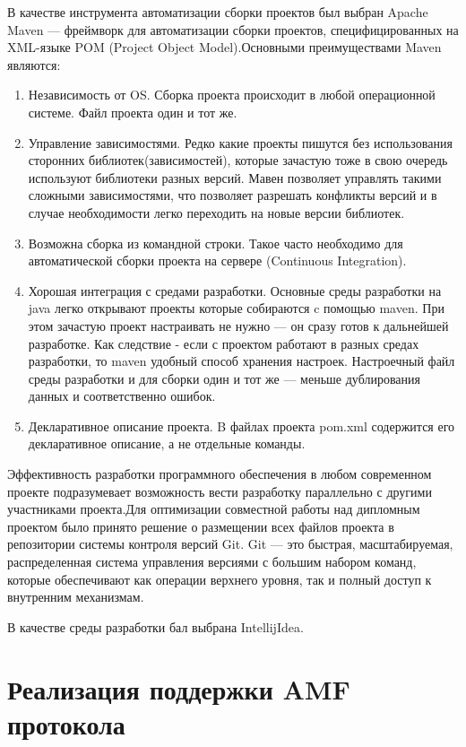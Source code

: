 В качестве инструмента автоматизации сборки проектов был выбран Apache Maven --- фреймворк для автоматизации сборки
проектов, специфицированных на XML-языке POM (Project Object Model).Основными преимуществами Maven являются:

\begin{enumerate}
\item Независимость от OS. Сборка проекта происходит в любой операционной системе. Файл проекта один и тот же.
\item Управление зависимостями. Редко какие проекты пишутся без использования сторонних библиотек(зависимостей), которые
 зачастую тоже в свою очередь используют библиотеки разных версий. Мавен позволяет управлять такими сложными
 зависимостями, что позволяет разрешать конфликты версий и в случае необходимости легко переходить на новые версии
 библиотек.
\item Возможна сборка из командной строки. Такое часто необходимо для автоматической сборки проекта на сервере
(Continuous Integration).
\item Хорошая интеграция с средами разработки. Основные среды разработки на java легко открывают проекты которые
собираются c помощью maven. При этом зачастую проект настраивать не нужно --- он сразу готов к дальнейшей разработке.
Как следствие - если с проектом работают в разных средах разработки, то maven удобный способ хранения настроек.
Настроечный файл среды разработки и для сборки один и тот же --- меньше дублирования данных и соответственно ошибок.
\item Декларативное описание проекта. B файлах проекта pom.xml содержится его декларативное описание, а не отдельные
команды.
\end{enumerate}

Эффективность разработки программного обеспечения в любом современном проекте подразумевает возможность вести
разработку параллельно с другими участниками проекта.Для оптимизации совместной работы над дипломным проектом было
принято решение о размещении всех файлов проекта в репозитории системы контроля версий Git. Git --- это быстрая,
масштабируемая, распределенная система управления версиями с большим набором команд, которые обеспечивают как
операции верхнего уровня, так и полный доступ к внутренним механизмам.

В качестве среды разработки бал выбрана IntellijIdea\cite{idea-book}.

\section{Реализация поддержки AMF протокола}

